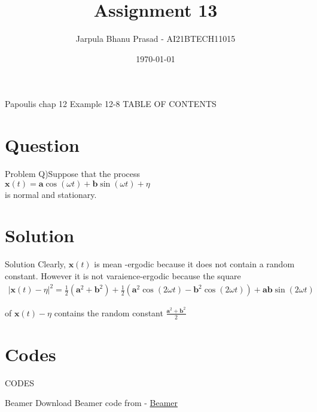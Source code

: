 \documentclass{beamer}
\title{Assignment 13}
\author{Jarpula Bhanu Prasad - AI21BTECH11015}
\date{\today}
\begin{document}
\begin{frame}
    \titlepage 
\end{frame}

\logo{}


\begin{frame}{Papoulis chap 12 Example 12-8}
TABLE OF CONTENTS
    \tableofcontents
\end{frame}


\section{Question}
\begin{frame}{Problem}
Q)Suppose that the process \\
$\textbf{x}(t) = \textbf{a}\cos(\omega t) + \textbf{b}\sin(\omega t) + \eta$ \\
is normal and stationary.
\end{frame}

\section{Solution}
\begin{frame}{Solution}
   Clearly, $\textbf{x}(t)$ is mean -ergodic because it does not contain a random constant. However it is not varaience-ergodic because the square 
   \begin{align}
       |\textbf{x}(t) - \eta|^2 = \frac{1}{2}(\textbf{a}^2+\textbf{b}^2) + \frac{1}{2}(\textbf{a}^2 \cos(2\omega t)-\textbf{b}^2 \cos(2\omega t)) + \textbf{ab}\sin(2\omega t)
   \end{align}

   of $\textbf{x}(t) - \eta$ contains the random constant $\frac{\textbf{a}^2+\textbf{b}^2}{2}$
\end{frame}

\section{Codes}
\begin{frame}{CODES}

 \begin{block}{Beamer}
         Download Beamer code from - \href{https://github.com/jarpula-Bhanu/Assignment-13/blob/main/Assignment_13.tex}{Beamer}
    \end{block}
\end{frame} 
\end{document}
